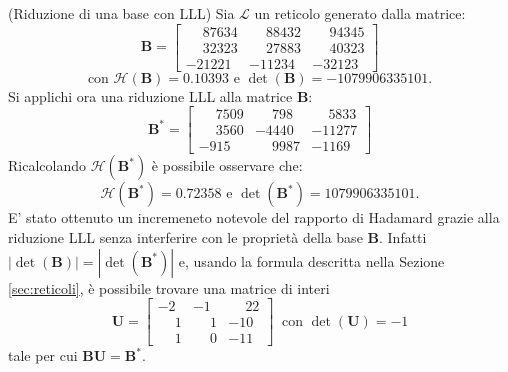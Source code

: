 \begin{exmp} (Riduzione di una base con LLL)
    Sia $\mathcal{L}$ un reticolo generato dalla matrice:
    \begin{equation*}
        \mathbf{B} =
        \begin{bmatrix*}
            \phantom{-}87634 & \phantom{-}88432 & \phantom{-}94345\\
            \phantom{-}32323 & \phantom{-}27883 & \phantom{-}40323\\
            -21221           & -11234           & -32123
        \end{bmatrix*}
    \end{equation*}
    \[
        \text{con } \mathcal{H}(\mathbf{B}) = 0.10393 \text{ e } \det(\mathbf{B}) = -1079906335101.
    \]
    Si applichi ora una riduzione LLL alla matrice $\mathbf{B}$:
    \begin{equation*}
        \mathbf{B}^* =
        \begin{bmatrix*}
            \phantom{-}7509 & \phantom{-}798  & \phantom{-}5833\\
            \phantom{-}3560 & -4440           & -11277\\
            -915            & \phantom{-}9987 & -1169
        \end{bmatrix*}
    \end{equation*}
    Ricalcolando $\mathcal{H}(\mathbf{B}^*)$ è possibile osservare che:
    \[
        \mathcal{H}(\mathbf{B}^*) = 0.72358 \text{ e }\det(\mathbf{B}^*) = 1079906335101.
    \]
    E' stato ottenuto un incremeneto notevole del rapporto di Hadamard grazie alla riduzione LLL senza 
    interferire con le proprietà della base $\mathbf{B}$. Infatti $|\det(\mathbf{B})| = |\det(\mathbf{B}^*)|$ e,
    usando la formula descritta nella Sezione \ref*{sec:reticoli}, 
    è possibile trovare una matrice di interi
    \begin{equation*}
        \mathbf{U} =
        \begin{bmatrix*}
            -2           & -1              & \phantom{-}22\\
            \phantom{-}1 & \phantom{-}1    & -10\\
            \phantom{-}1 & \phantom{-}0    & -11
        \end{bmatrix*}
        \ \text{ con } \det(\mathbf{U}) = -1
    \end{equation*}
    tale per cui $\mathbf{B}\mathbf{U} = \mathbf{B}^*$.
\end{exmp}

